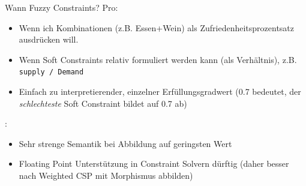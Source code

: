 \begin{frame}{Wann Fuzzy Constraints?}
\alert{Pro}:

\begin{itemize}
\item Wenn ich Kombinationen (z.B. Essen+Wein) als Zufriedenheitsprozentsatz ausdrücken will.
\item Wenn Soft Constraints relativ formuliert werden kann (als Verhältnis), z.B. \texttt{supply / Demand}  
\item Einfach zu interpretierender, einzelner Erfüllungsgradwert (0.7 bedeutet, der \emph{schlechteste} Soft Constraint bildet  auf 0.7 ab)
\end{itemize}

\vspace*{2ex}
:

\begin{itemize}
\item Sehr strenge Semantik bei Abbildung auf geringsten Wert 
\item Floating Point Unterstützung in Constraint Solvern dürftig (daher besser nach Weighted CSP mit Morphismus abbilden)
\end{itemize}
\end{frame}